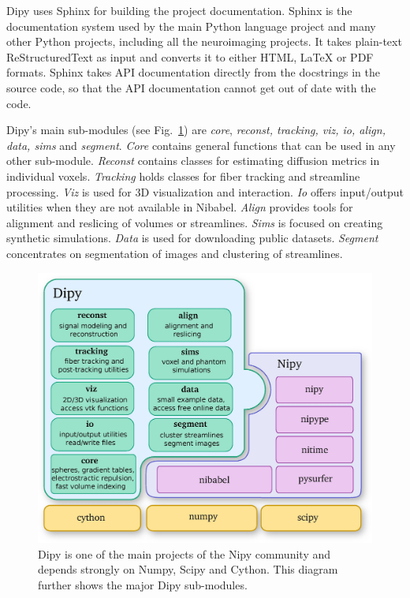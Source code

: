 \documentclass{bioinfo}
\begin{document}
Dipy uses Sphinx for building the project documentation. Sphinx is the
documentation system used by the main Python language project and many other
Python projects, including all the neuroimaging projects.  It takes plain-text
ReStructuredText as input and converts it to either HTML, LaTeX or PDF formats.
Sphinx takes API documentation directly from the docstrings in the source code,
so that the API documentation cannot get out of date with the code.

Dipy's main sub-modules (see Fig.~\ref{Fig:module_structure}) are \emph{core},
\emph{reconst, tracking, viz, io, align, data, sims} and \emph{segment}.
\emph{Core} contains general functions that can be used in any other sub-module.
\emph{Reconst} contains classes for estimating diffusion metrics in individual
voxels. \emph{Tracking} holds classes for fiber tracking and streamline
processing. \emph{Viz} is used for 3D visualization and interaction. \emph{Io}
offers input/output utilities when they are not available in Nibabel.
\emph{Align} provides tools for alignment and reslicing of volumes or
streamlines. \emph{Sims} is focused on creating synthetic simulations.
\emph{Data} is used for downloading public datasets. \emph{Segment} concentrates
on segmentation of images and clustering of streamlines.

\begin{figure}
\includegraphics[scale=0.44]{Figures/module_structure2.jpg}
\centering{}
\caption{Dipy is one of the main projects of the Nipy community and depends strongly
on Numpy, Scipy and Cython. This diagram further shows the major Dipy sub-modules.\label{Fig:module_structure}}
\end{figure}
\end{document}
